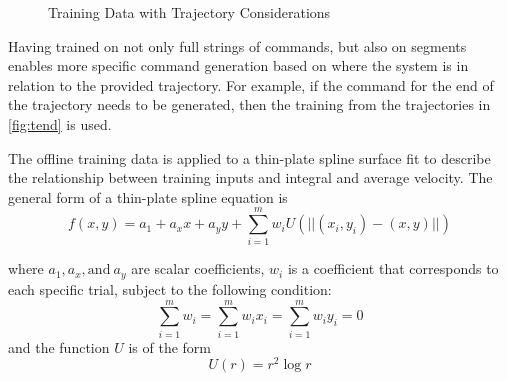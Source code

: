 \documentclass[letterpaper, 10 pt, conference]{ieeeconf}  %
\begin{document}
\begin{figure}[h]
	\centering
	\caption{Training Data with Trajectory Considerations}
	\label{fig:trainelab}
\end{figure}

Having trained on not only full strings of commands, but also on segments enables more specific command generation based on where the system is in relation to the provided trajectory. For example, if the command for the end of the trajectory needs to be generated, then the training from the trajectories in \ref{fig:tend} is used.

The offline training data is applied to a thin-plate spline surface fit to describe the relationship between training inputs and integral and average velocity. The general form of a thin-plate spline equation is 
\begin{equation}
    f(x,y) = a_1 + a_xx + a_yy + \sum_{i=1}^mw_iU(||(x_i,y_i)-(x,y)||)
\end{equation}

where $a_1,a_x,\text{and}~a_y$ are scalar coefficients, $w_i$ is a coefficient that corresponds to each specific trial, subject to the following condition: \begin{equation}
\sum_{i=1}^mw_i=\sum_{i=1}^mw_ix_i=\sum_{i=1}^mw_iy_i=0
\end{equation}
and the function $U$ is of the form
\begin{equation}
  U(r) = r^2\log{r} 
\end{equation}
\end{document}
